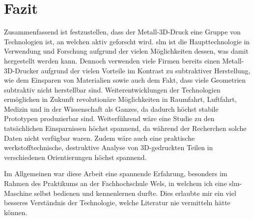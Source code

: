 \documentclass[../main.tex]{subfiles}
\begin{document}
\section{Fazit}
Zusammenfassend ist festzustellen, dass der Metall-3D-Druck eine Gruppe von Technologien ist, an welchen aktiv geforscht wird. \acrshort{slm} ist die Haupttechnologie in Verwendung und Forschung aufgrund der vielen Möglichkeiten dessen, was damit hergestellt werden kann.
Dennoch verwenden viele Firmen bereits einen Metall-3D-Drucker aufgrund der vielen Vorteile im Kontrast zu subtraktiver Herstellung, wie dem Einsparen von Materialien sowie auch dem Fakt, dass viele Geometrien subtraktiv nicht herstellbar sind. 
Weiterentwicklungen der Technologien ermöglichen in Zukunft revolutionäre Möglichkeiten in Raumfahrt, Luftfahrt, Medizin und in der Wissenschaft als Ganzes, da dadurch höchst stabile Prototypen produzierbar sind.\parencite{Singh2020} 
Weiterführend wäre eine Studie zu den tatsächlichen Einsparnissen höchst spannend, da während der Recherchen solche Daten nicht verfügbar waren. Zudem wäre auch eine praktische werkstofftechnische, destruktive Analyse von 3D-gedruckten Teilen in verschiedenen Orientierungen höchst spannend.

Im Allgemeinen war diese Arbeit eine spannende Erfahrung, besonders im Rahmen des Praktikums an der Fachhochschule Wels, in welchem ich eine \acrshort{slm}-Maschine selbst bedienen und kennenlernen durfte. Dies erlaubte mir ein viel besseres Verständnis der Technologie, welche Literatur nie vermitteln hätte können.
\end{document}
